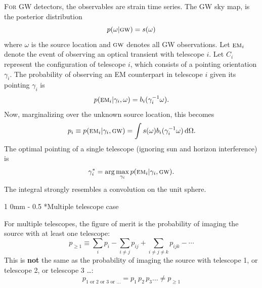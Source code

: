 \documentclass[portrait]{a0poster}
\makeatletter
\newcommand{\EM}[1]{\ensuremath{\textsc{\textrm{em}}_#1}}
\newcommand{\GW}{\ensuremath{\textsc{\textrm{gw}}}}
\renewcommand{\section}{\@startsection
{section}%
{1}%
{0mm}%
{-\baselineskip}%
{0.5\baselineskip}%
{\fontspec{Marvel Bold}\Huge}} %
\makeatother
\begin{document}
\lettrine{F}{\textnormal{or}} GW detectors, the observables are strain time series.  The GW sky map, is the posterior distribution
$$
	p(\omega | \GW) = s(\omega)
$$
where $\omega$ is the source location and $\GW$ denotes all GW observations.  Let $\EM{i}$ denote the event of observing an optical transient with telescope $i$.  Let $C_i$ represent the configuration of telescope $i$, which consists of a pointing orientation $\gamma_i$.  The probability of observing an EM counterpart in telescope $i$ given its pointing $\gamma_i$ is
$$
	p(\EM{i} | \gamma_i, \omega) = b_i(\gamma_i^{-1} \omega).
$$
Now, marginalizing over the unknown source location, this becomes
$$
	p_i \equiv p (\EM{i} | \gamma_i, \GW) = \int s(\omega) b_i(\gamma_i^{-1} \omega) \, \mathrm{d}\Omega.
$$
The optimal pointing of a single telescope (ignoring sun and horizon interference) is
$$
	\gamma_i^* = \arg \max_{\gamma_i} p(\EM{i} | \gamma_i, \GW).
$$
The integral strongly resembles a convolution on the unit sphere.

\section*{Multiple telescope case}

For multiple telescopes, the figure of merit is the probability of imaging the source with at least one telescope:
$$
	p_{\geqslant 1} \equiv \sum_i p_i - \sum_{i \neq j} p_{ij} + \sum_{i \neq j \neq k} p_{ijk} - \cdots
$$
This is \textbf{not} the same as the probability of imaging the source with telescope 1, or telescope 2, or telescope 3 \dots :
$$
	p_{1 \textrm{ or } 2 \textrm{ or } 3 \textrm{ or } \dots} = p_1 \, p_2 \, p_3 \dots \neq p_{\geqslant 1}
$$



\end{document}
